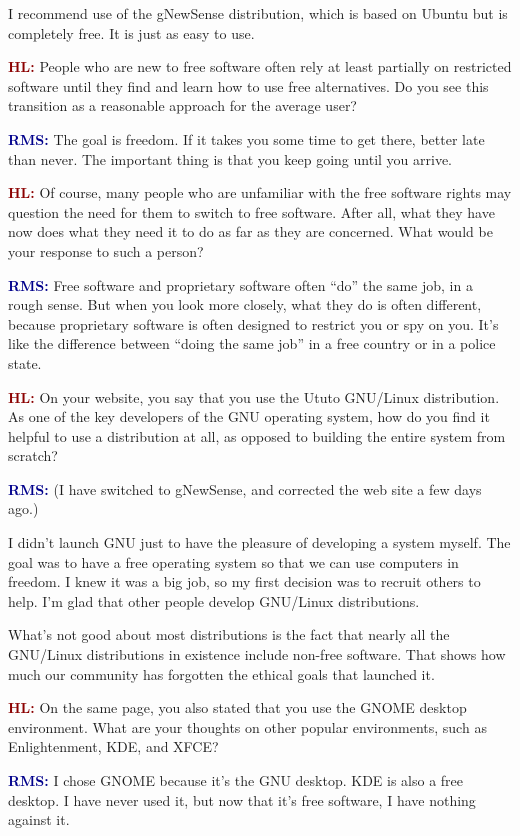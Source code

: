 \documentclass{article}
\newcommand{\hl}{\textcolor{DarkRed}{\textbf{HL: }}}
\newcommand{\rms}{\textcolor{DarkBlue}{\textbf{RMS: }}}
\begin{document}
I recommend use of the gNewSense distribution, which is based on Ubuntu but is completely free. It is just as easy to use.

\hl People who are new to free software often rely at least partially on restricted software until they find and learn how to use free alternatives. Do you see this transition as a reasonable approach for the average user?

\rms The goal is freedom. If it takes you some time to get there, better late than never. The important thing is that you keep going until you arrive.

\hl Of course, many people who are unfamiliar with the free software rights may question the need for them to switch to free software. After all, what they have now does what they need it to do as far as they are concerned. What would be your response to such a person?

\rms Free software and proprietary software often ``do'' the same job, in a rough sense. But when you look more closely, what they do is often different, because proprietary software is often designed to restrict you or spy on you. It's like the difference between ``doing the same job'' in a free country or in a police state.

\hl On your website, you say that you use the Ututo GNU/Linux distribution. As one of the key developers of the GNU operating system, how do you find it helpful to use a distribution at all, as opposed to building the entire system from scratch?

\rms (I have switched to gNewSense, and corrected the web site a few days ago.)

I didn't launch GNU just to have the pleasure of developing a system myself. The goal was to have a free operating system so that we can use computers in freedom. I knew it was a big job, so my first decision was to recruit others to help. I'm glad that other people develop GNU/Linux distributions.

What's not good about most distributions is the fact that nearly all the GNU/Linux distributions in existence include non-free software. That shows how much our community has forgotten the ethical goals that launched it.

\hl On the same page, you also stated that you use the GNOME desktop environment. What are your thoughts on other popular environments, such as Enlightenment, KDE, and XFCE?

\rms I chose GNOME because it's the GNU desktop. KDE is also a free desktop. I have never used it, but now that it's free software, I have nothing against it.
\end{document}
